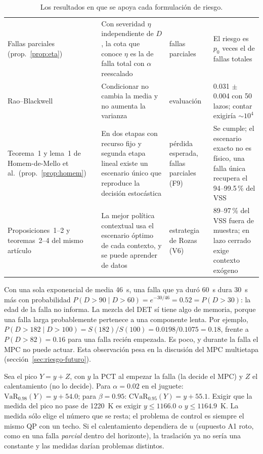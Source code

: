 \begin{table}[H]
\begin{tabularx}{\linewidth}{@{}>{\raggedright\arraybackslash}p{30mm} Y >{\raggedright\arraybackslash}p{22mm} Y@{}}
Fallas parciales (prop.~\ref{prop:eta}) & Con severidad $\eta$ independiente de $D$, la cota que conoce $\eta$ es la de falla total con $\alpha$ reescalado & fallas parciales & El riesgo es $p_0$ veces el de fallas totales\\
Rao--Blackwell~\cite{casella2002} & Condicionar no cambia la media y no aumenta la varianza & evaluación & 0.031 $\pm$ 0.004 con 50 lazos; contar exigiría $\sim10^4$\\
Teorema~1 y lema~1 de Homem-de-Mello et al.\ (prop.~\ref{prop:homem}) & En dos etapas con recurso fijo y segunda etapa lineal existe un escenario único que reproduce la decisión estocástica & pérdida esperada, fallas parciales (F9) & Se cumple; el escenario exacto no es físico, una falla única recupera el 94--99.5\,\% del VSS\\
Proposiciones~1--2 y teoremas~2--4 del mismo artículo & La mejor política contextual usa el escenario óptimo de cada contexto, y se puede aprender de datos & estrategia de Rozas (V6) & 89--97\,\% del VSS fuera de muestra; en lazo cerrado exige contexto exógeno\\\bottomrule
\end{tabularx}
\caption{Los resultados en que se apoya cada formulación de riesgo.}
\label{tab:riesgo-teoremas}
\end{table}

\begin{ejemplo}\label{ej:memoria}
Con una sola exponencial de media 46~s, una falla que ya duró 60~s dura 30~s más con probabilidad
$P(D>90\mid D>60)=e^{-30/46}=0.52=P(D>30)$: la edad de la falla no informa. La mezcla del DET sí
tiene algo de memoria, porque una falla larga probablemente pertenece a una componente lenta. Por
ejemplo, $P(D>182\mid D>100)=S(182)/S(100)=0.0198/0.1075=0.18$, frente a $P(D>82)=0.16$ para una
falla recién empezada. Es poco, y durante la falla el MPC no puede actuar. Esta observación pesa en
la discusión del MPC multietapa (sección~\ref{sec:riesgo-futuro}).
\end{ejemplo}

\begin{ejemplo}
Sea el pico $Y=y+Z$, con $y$ la PCT al empezar la falla (la decide el MPC) y $Z$ el calentamiento
(no lo decide). Para $\alpha=0.02$ en el juguete: $\mathrm{VaR}_{0.98}(Y)=y+54.0$; para
$\beta=0.95$: $\mathrm{CVaR}_{0.95}(Y)=y+55.1$. Exigir que la medida del pico no pase de 1220~K es
exigir $y\le1166.0$ o $y\le1164.9$~K. La medida sólo elige el número que se resta; el problema de
control es siempre el mismo QP con un techo. Si el calentamiento dependiera de $u$ (supuesto A1
roto, como en una falla \emph{parcial} dentro del horizonte), la traslación ya no sería una
constante y las medidas darían problemas distintos.
\end{ejemplo}

